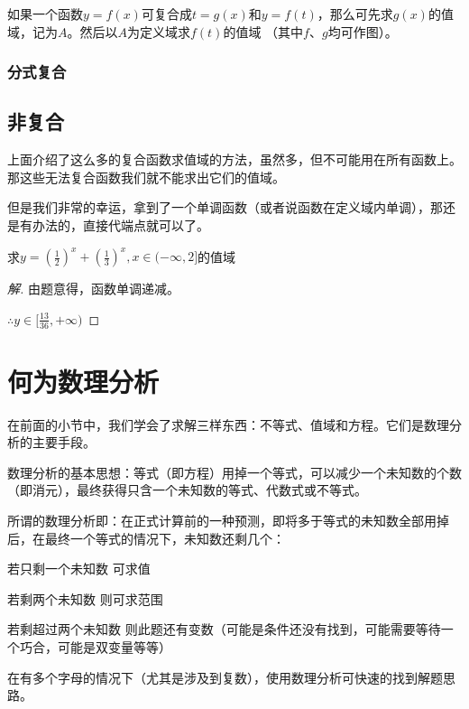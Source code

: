 如果一个函数$y=f(x)$可复合成$t=g(x)$和$y=f(t)$，那么可先求$g(x)$的值域，记为$A$。然后以$A$为定义域求$f(t)$的值域
（其中$f$、$g$均可作图）。

\subsubsection{分式复合}


\subsection{非复合}
上面介绍了这么多的复合函数求值域的方法，虽然多，但不可能用在所有函数上。那这些无法复合函数我们就不能求出它们的值域。

但是我们非常的幸运，拿到了一个单调函数（或者说函数在定义域内单调），那还是有办法的，直接代端点就可以了。

\begin{example}
	求$y=(\frac{1}{2})^x+(\frac{1}{3})^x,x\in(-\infty,2]$的值域
\end{example}
\begin{proof}[解]
	由题意得，函数单调递减。

	$\therefore y\in[\frac{13}{36},+\infty)$
\end{proof}

\section{何为数理分析}
在前面的小节中，我们学会了求解三样东西：不等式、值域和方程。它们是数理分析的主要手段。

数理分析的基本思想：等式（即方程）用掉一个等式，可以减少一个未知数的个数（即消元），最终获得只含一个未知数的等式、代数式或不等式。

所谓的数理分析即：在正式计算前的一种预测，即将多于等式的未知数全部用掉后，在最终一个等式的情况下，未知数还剩几个：

\begin{desclist}
	\item[若只剩一个未知数] 可求值
	\item[若剩两个未知数] 则可求范围
	\item[若剩超过两个未知数] 则此题还有变数（可能是条件还没有找到，可能需要等待一个巧合，可能是双变量等等）
\end{desclist}

在有多个字母的情况下（尤其是涉及到复数），使用数理分析可快速的找到解题思路。

